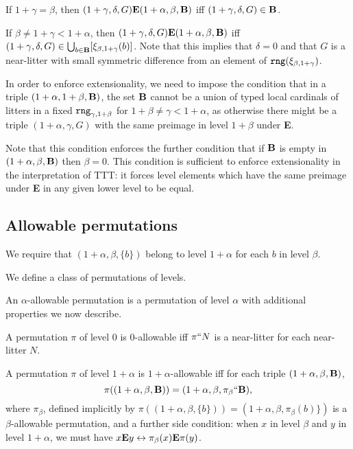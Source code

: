 \documentclass[12pt]{article}
\begin{document}
If $1+\gamma=\beta$, then $(1+\gamma,\delta,G) {\bf E} (1+\alpha,\beta,{\bf B})$ iff $(1+\gamma,\delta,G) \in {\bf B}$.  

If $\beta \neq 1+\gamma <1+\alpha$, then $(1+\gamma,\delta,G) {\bf E} (1+\alpha,\beta,{\bf B})$ iff $(1+\gamma,\delta,G) \in \bigcup_{b \in {\bf B}}[\xi_{\beta,1+\gamma}(b)]$.  Note that this implies
that $\delta=0$ and that $G$ is a near-litter with small symmetric difference from an element of ${\tt rng}(\xi_{\beta,1+\gamma})$.

In order to enforce extensionality, we need to impose the condition that in a triple $(1+\alpha,1+\beta,{\bf B})$, the set ${\bf B}$ cannot be a union of typed local cardinals of litters
in a fixed ${\tt rng}_{\gamma,1+\beta}$ for $1+\beta\neq \gamma<1+\alpha$, as otherwise there might be a triple $(1+\alpha,\gamma,G)$ with the same preimage in level $1+\beta$ under {\bf E}.


Note that this condition enforces the further condition that if ${\bf B}$ is empty in $(1+\alpha,\beta,{\bf B})$ then $\beta=0$.  This condition is sufficient to enforce extensionality in the interpretation of TTT:  it forces level elements which have the same preimage under {\bf E} in any given lower level to be equal.

\subsection{Allowable permutations}

We require that $(1+\alpha,\beta,\{b\})$ belong to level $1+\alpha$ for
each $b$ in level $\beta$.

We define a class of permutations of levels.

An $\alpha$-allowable permutation is a permutation of level $\alpha$ with additional properties we now describe.

A permutation $\pi$ of level 0 is 0-allowable iff $\pi``N$ is a near-litter for each near-litter $N$.

A permutation $\pi$ of level $1+\alpha$ is $1+\alpha$-allowable iff for each triple $(1+\alpha,\beta,{\bf B})$, $$\pi((1+\alpha,\beta,{\bf B})) = (1+\alpha,\beta,\pi_{\beta}``{\bf B}),$$ where $\pi_\beta$, defined implicitly by $\pi((1+\alpha,\beta,\{b\})) = (1+\alpha,\beta,\pi_\beta(b)\})$ is a $\beta$-allowable permutation, and a further side condition:  when $x$ in level $\beta$ and $y$ in level $1+\alpha$, we must have $x {\bf E} y \leftrightarrow \pi_{\beta}(x) {\bf E} \pi(y)$.
\end{document}
